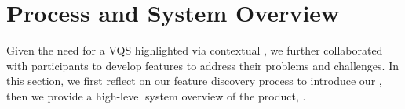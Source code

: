  \section{ Process and System Overview\label{sec:pd_findings}}
 Given the need for a VQS highlighted via contextual , we further collaborated with participants to develop features to address their problems and challenges. In this section, we first reflect on our feature discovery process to introduce our , then we provide a high-level system overview of the  product, \zvpp.
